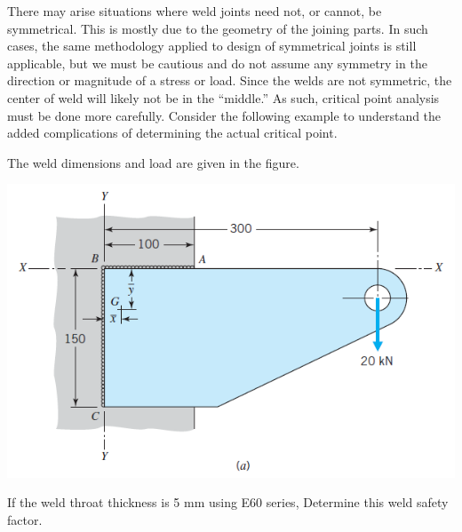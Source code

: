 \documentclass[
10pt,
a4paper,
openany,
svgnames,
]{book}
\begin{document}
There may arise situations where weld joints need not, or cannot, be symmetrical. This is mostly due to the geometry of the joining parts. In such cases, the same methodology applied to design of symmetrical joints is still applicable, but we must be cautious and do not assume any symmetry in the direction or magnitude of a stress or load. Since the welds are not symmetric, the center of weld will likely not be in the ``middle.'' As such, critical point analysis must be done more carefully. Consider the following example to understand the added complications of determining the actual critical point.

\begin{example}
  The weld dimensions and load are given in the figure.
  \begin{center}
    \includegraphics[scale=0.55]{pictures/Welding/weld-under-torsion-and-bending}
  \end{center}
  If the weld throat thickness is 5 mm using E60 series, Determine this weld safety factor.
\end{example}
\end{document}

